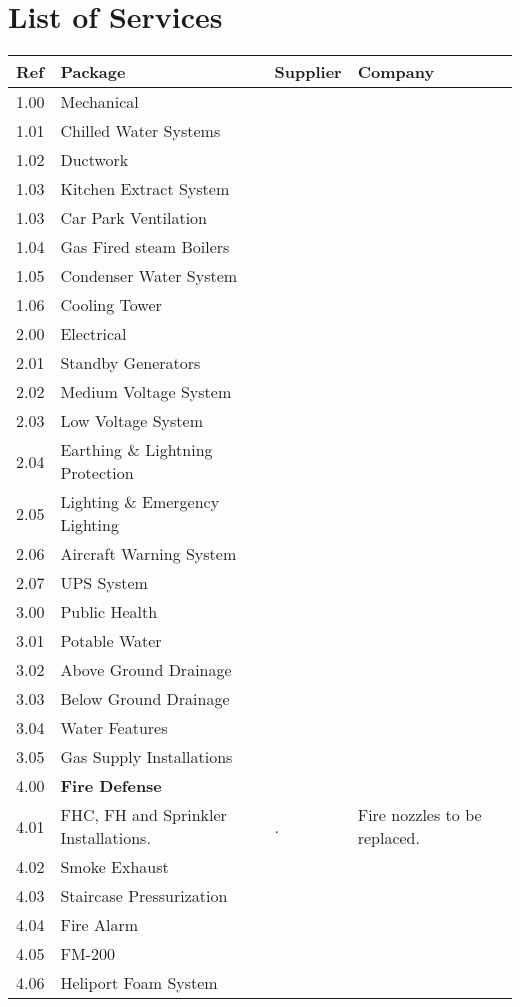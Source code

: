 \chapter{List of Services}
\label{chap:listofservices}

\begin{longtable}{llll}
\toprule
Ref	&Package	&Supplier	&Company\\
\midrule
1.00	&Mechanical	&	&\\
1.01	&Chilled Water Systems	&	&\\
1.02	&Ductwork  &		&\\
1.03    &Kitchen Extract System &&\\
1.03	&Car Park Ventilation 	&&\\
1.04	&Gas Fired steam Boilers &&		\\
1.05	&Condenser Water System 	&&     \\
1.06    &Cooling Tower &&  \\
\midrule
2.00	&Electrical		&&\\
2.01	&Standby Generators	&&\\	
2.02	&Medium Voltage System	&&\\	
2.03	&Low Voltage System		&&\\
2.04	&Earthing \& Lightning Protection &&\\		
2.05	&Lighting \& Emergency Lighting  &&\\		
2.06	&Aircraft Warning System &&\\		
2.07	&UPS System	&&\\	
\midrule
3.00	&Public Health		&&\\
3.01	&Potable Water	&&\\	
3.02	&Above Ground Drainage &&\\		
3.03	&Below Ground Drainage  &&\\		
3.04	&Water Features	     &&\\	
3.05	&Gas Supply Installations	&&\\	
\midrule		
4.00	&\textbf{Fire Defense} &&\\	
4.01	&FHC, FH and Sprinkler Installations.	&.& Fire nozzles to be replaced.\\	
4.02	&Smoke Exhaust		&&\\
4.03	&Staircase Pressurization          &&\\		
4.04	&Fire Alarm		&&\\
4.05	&FM-200		&&\\
4.06	&Heliport Foam System	 &&\\	

\end{longtable}
